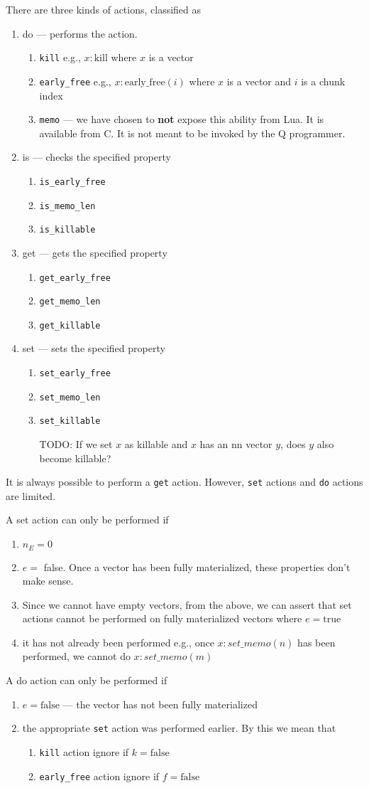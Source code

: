 \documentclass[letterpaper,12pt]{article}
\newcommand{\TBC}{\framebox{\textbf{TO BE COMPLETED}}}
\newcommand{\be}{\begin{enumerate}}
\newcommand{\ee}{\end{enumerate}}
\begin{document}
There are three kinds of actions, classified as 
\be
\item do  --- performs the action.
  \be
\item {\tt kill} e.g., \(x:\mathrm{kill}\) where \(x\) is a vector 
\item {\tt early\_free} e.g., 
  \(x:\mathrm{early\_free}(i)\) where \(x\) is a vector and \(i\) is a chunk index
\item {\tt memo} --- we have chosen to {\bf not} expose this ability 
  from Lua. It is available from C. It is not meant to be invoked by the Q
  programmer. 
  \ee
\item is --- checks the specified property
  \be
\item {\tt is\_early\_free}
\item {\tt is\_memo\_len}
\item {\tt is\_killable}
  \ee
\item get --- gets the specified property
  \be
\item {\tt get\_early\_free}
\item {\tt get\_memo\_len}
\item {\tt get\_killable}
  \ee
\item set --- sets the specified property
  \be
\item {\tt set\_early\_free}
\item {\tt set\_memo\_len}
\item {\tt set\_killable}

  TODO: If we set \(x\) as killable and \(x\) has an nn vector \(y\), does \(y\)
  also become killable? \TBC
  
  \ee
\ee

It is always possible to perform a {\tt get} action. However, {\tt set} actions
and {\tt do} actions are limited. 

A set action can only be performed if 
\be
\item \(n_E = 0\)
\item \(e = \) false. Once a vector has been fully materialized, 
  these properties don't make sense.
\item Since we cannot have empty vectors, from the above, we can assert that set
  actions cannot be performed on fully materialized vectors where 
  \(e = \mathrm{true}\)
\item it has not already been performed e.g., once \(x:set\_memo(n)\) 
  has been performed, we cannot do \(x:set\_memo(m)\)
\ee

A do action can only be performed if 
\be
\item \(e = \mathrm{false}\) --- the vector has not been fully materialized
\item the appropriate {\tt set} action was performed earlier. By this we mean
  that
  \be
\item {\tt kill} action ignore if \(k = \mathrm{false}\)
\item {\tt early\_free} action ignore if \(f = \mathrm{false}\)
  \ee
  \ee
\end{document}
